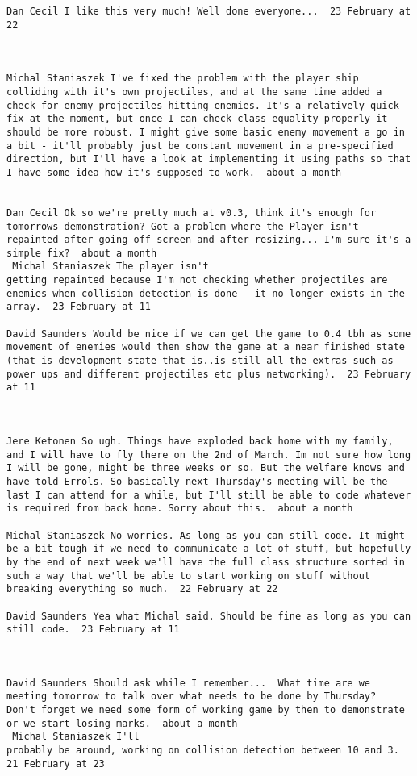 \begin{verbatim}
Dan Cecil I like this very much! Well done everyone...  23 February at
22



Michal Staniaszek I've fixed the problem with the player ship
colliding with it's own projectiles, and at the same time added a
check for enemy projectiles hitting enemies. It's a relatively quick
fix at the moment, but once I can check class equality properly it
should be more robust. I might give some basic enemy movement a go in
a bit - it'll probably just be constant movement in a pre-specified
direction, but I'll have a look at implementing it using paths so that
I have some idea how it's supposed to work.  about a month 


Dan Cecil Ok so we're pretty much at v0.3, think it's enough for
tomorrows demonstration? Got a problem where the Player isn't
repainted after going off screen and after resizing... I'm sure it's a
simple fix?  about a month 
 Michal Staniaszek The player isn't
getting repainted because I'm not checking whether projectiles are
enemies when collision detection is done - it no longer exists in the
array.  23 February at 11

David Saunders Would be nice if we can get the game to 0.4 tbh as some
movement of enemies would then show the game at a near finished state
(that is development state that is..is still all the extras such as
power ups and different projectiles etc plus networking).  23 February
at 11



Jere Ketonen So ugh. Things have exploded back home with my family,
and I will have to fly there on the 2nd of March. Im not sure how long
I will be gone, might be three weeks or so. But the welfare knows and
have told Errols. So basically next Thursday's meeting will be the
last I can attend for a while, but I'll still be able to code whatever
is required from back home. Sorry about this.  about a month 

Michal Staniaszek No worries. As long as you can still code. It might
be a bit tough if we need to communicate a lot of stuff, but hopefully
by the end of next week we'll have the full class structure sorted in
such a way that we'll be able to start working on stuff without
breaking everything so much.  22 February at 22

David Saunders Yea what Michal said. Should be fine as long as you can
still code.  23 February at 11



David Saunders Should ask while I remember...  What time are we
meeting tomorrow to talk over what needs to be done by Thursday?
Don't forget we need some form of working game by then to demonstrate
or we start losing marks.  about a month 
 Michal Staniaszek I'll
probably be around, working on collision detection between 10 and 3.
21 February at 23




\end{verbatim}
